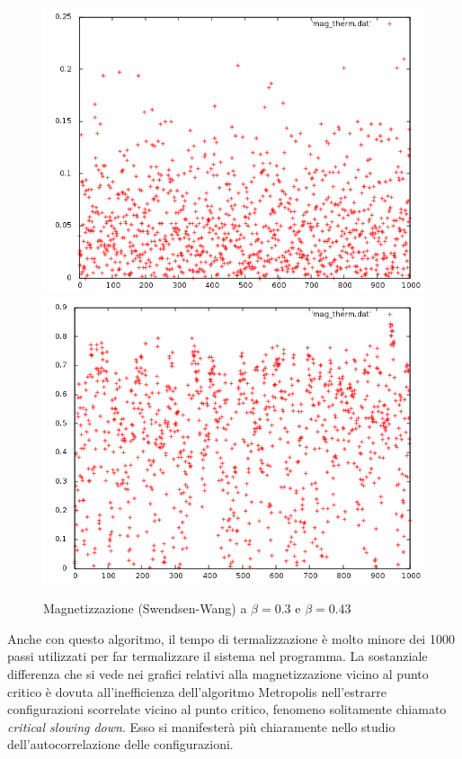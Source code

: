 \begin{figure}[h]
\includegraphics[scale=0.35]{sw/mag_therm0-3.png}
\includegraphics[scale=0.35]{sw/mag_therm0-43.png}
\caption{Magnetizzazione  (Swendsen-Wang) a $\beta=0.3$ e $\beta=0.43$}
\end{figure}
Anche con questo algoritmo, il tempo di termalizzazione è molto minore dei 1000 passi utilizzati per far termalizzare il sistema nel programma.
La sostanziale differenza che si vede nei grafici relativi alla magnetizzazione vicino al punto critico è dovuta all'inefficienza dell'algoritmo Metropolis nell'estrarre configurazioni scorrelate vicino al punto critico, fenomeno solitamente chiamato \emph{critical slowing down}.
Esso si manifesterà più chiaramente nello studio dell'autocorrelazione delle configurazioni.


